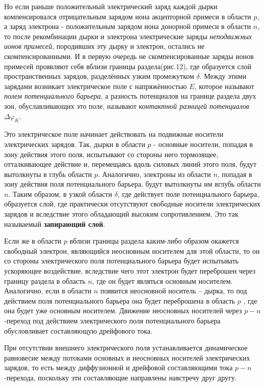 	\par Но если раньше положительный электрический заряд каждой дырки компенсировался отрицательным зарядом иона акцепторной примеси в области \(p\), а заряд электрона - положительным зарядом иона донорной примеси в области \(n\), то после рекомбинации дырки и электрона электрические заряды \textit{неподвижных ионов примесей}, породивших эту дырку и электрон, остались не скомпенсированными. И в первую очередь не скомпенсированные заряды ионов примесей проявляют себя вблизи границы раздела(рис.12), где образуется слой пространственных зарядов, разделённых узким промежутком  $\delta$. Между этими зарядами возникает электрическое поле с напряжённостью \(E\), которое называют \textit{полем потенциального барьера}, а разность потенциалов на границе раздела двух зон, обуславливающих это поле, называют \textit{контактной разницей потенциалов} $\Delta \varphi_K$.
	
	\par Это электрическое поле начинает действовать на подвижные носители электрических зарядов. Так, дырки в области \(p\) - основные носители, попадая в зону действия этого поля, испытывают со стороны него тормозящее, отталкивающее действие и, перемещаясь вдоль силовых линий этого поля, будут вытолкнуты в глубь области \(p\). Аналогично, электроны из области \(n\), попадая в зону действия поля потенциального барьера, будут вытолкнуты им вглубь области \(n\). Таким образом, в узкой области $\delta$, где действует поле потенциального барьера, образуется слой, где практически отсутствуют свободные носители электрических зарядов и вследствие этого обладающий высоким сопротивлением. Это так называемый \textbf{запирающий слой}.
	
	\par Если же в области \(p\) вблизи границы раздела каким-либо образом окажется свободный электрон, являющийся неосновным носителем для этой области, то он со стороны электрического поля потенциального барьера будет испытывать ускоряющее воздействие, вследствие чего этот электрон будет переброшен через границу раздела в область \(n\), где он будет являться основным носителем. Аналогично, если в области \(n\) появится неосновной носитель – дырка, то под действием поля потенциального барьера она будет переброшена в область \(p\) , где она будет уже основным носителем. Движение неосновных носителей через \(p-n\)-переход под действием электрического поля потенциального барьера обусловливает составляющую дрейфового тока.
	
	\par При отсутствии внешнего электрического поля устанавливается динамическое равновесие между потоками основных и неосновных носителей электрических зарядов, то есть между диффузионной и дрейфовой составляющими тока \(p-n\)-перехода, поскольку эти составляющие направлены навстречу друг другу.
	
